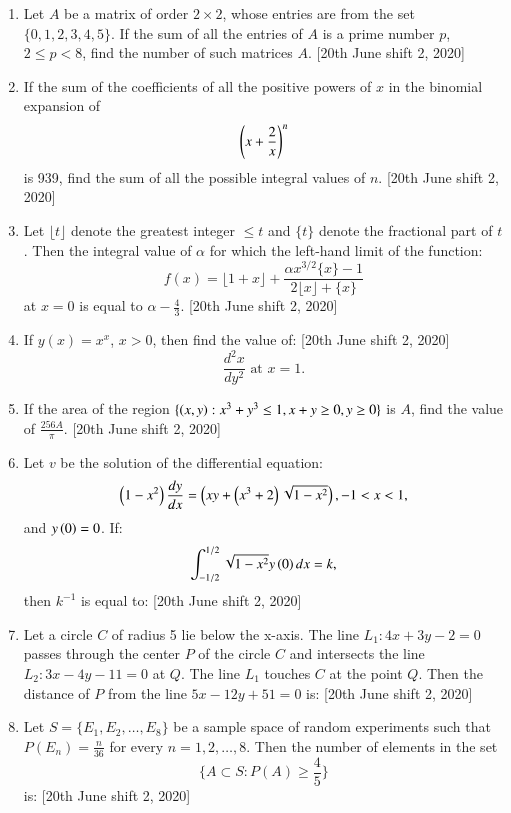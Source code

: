 \documentclass[journal,12pt,twocolumn]{IEEEtran}
\theoremstyle{remark}
\begin{document}
\begin{enumerate}
    \item Let $ A $ be a matrix of order $ 2 \times 2 $, whose entries are from the set $ \{0, 1, 2, 3, 4, 5\} $. If the sum of all the entries of $ A $ is a prime number $ p $, $ 2 \leq p < 8 $, find the number of such matrices $ A $. \hfill{[20th June shift 2, 2020]}

    \item If the sum of the coefficients of all the positive powers of $ x $ in the binomial expansion of 
    \[
    \left(x + \frac{2}{x}\right)^n
    \]
    is 939, find the sum of all the possible integral values of $ n $. \hfill{[20th June shift 2, 2020]}


    \item Let $ \lfloor t \rfloor $ denote the greatest integer $ \leq t $ and $ \{ t \} $ denote the fractional part of $ t $. Then the integral value of $ \alpha $ for which the left-hand limit of the function:
    \[
    f(x) = \lfloor 1 + x \rfloor + \frac{\alpha x^{3/2} \{ x \} - 1}{2 \lfloor x \rfloor + \{ x \}}
    \]
    at $ x = 0 $ is equal to $ \alpha - \frac{4}{3} $.  \hfill{[20th June shift 2, 2020]}

    \item If $ y(x) = x^x $, $ x > 0 $, then find the value of: \hfill{[20th June shift 2, 2020]}
    \[
    \frac{d^2x}{dy^2} \text{ at } x = 1.
    \]

    \item If the area of the region $ \{ \left(x, y\right): x^3 + y^3 \leq 1, x + y \geq 0, y \geq 0 \} $ is $ A $, find the value of $ \frac{256A}{\pi} $. \hfill{[20th June shift 2, 2020]}

    \item Let $ v $ be the solution of the differential equation: 
    \[
    \left(1 - x^2\right) \frac{dy}{dx} = \left(xy + \left(x^3 + 2\right)\sqrt{1 - x^2}\right), -1 < x < 1,
    \]
    and $ y\left(0\right) = 0 $. If:
    \[
    \int_{-1/2}^{1/2} \sqrt{1 - x^2} y\left(0\right) dx = k,
    \]
    then $ k^{-1} $ is equal to: \hfill{[20th June shift 2, 2020]}

    \item Let a circle $ C $ of radius 5 lie below the x-axis. The line $ L_1: 4x + 3y - 2 = 0 $ passes through the center $ P $ of the circle $ C $ and intersects the line $ L_2: 3x - 4y - 11 = 0 $ at $ Q $. The line $ L_1 $ touches $ C $ at the point $ Q $. Then the distance of $ P $ from the line $ 5x - 12y + 51 = 0 $ is:  \hfill{[20th June shift 2, 2020]}
    
    \item Let $ S = \{ E_1, E_2, \dots, E_8 \} $ be a sample space of random experiments such that $ P(E_n) = \frac{n}{36} $ for every $ n = 1, 2, \dots, 8 $. Then the number of elements in the set 
    \[
    \{ A \subset S : P(A) \geq \frac{4}{5} \}
    \]
    is:  \hfill{[20th June shift 2, 2020]}
   

    
\end{enumerate}
\end{document}
